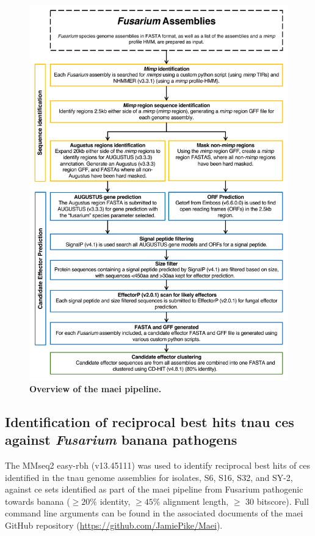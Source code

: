\begin{figure}[htp!]
    \centering
    \includegraphics[width=14cm]{Figures/Maie_v5_Figure.pdf}
    \caption[Overview of the \acf{maei} pipeline.]{\textbf{Overview of the \acf{maei} pipeline.}}  
    \label{fig:MaeiPipeline}
\end{figure}

\subsection{Identification of reciprocal best hits \acl{tnau} \aclp{ce} against \textit{Fusarium} banana pathogens}

The MMseq2 easy-rbh (v13.45111) \parencite{Steinegger2017} was used to identify reciprocal best hits of \acp{ce} identified in the \ac{tnau} genome assemblies for isolates, S6, S16, S32, and SY-2, against \ac{ce} sets identified as part of the \ac{maei} pipeline from Fusarium pathogenic towards banana ($\geq 20\%$ identity, $\geq 45\%$ alignment length, $\geq$ 30 bitscore). Full command line arguments can be found in the associated documents of the \ac{maei} GitHub repository (\href{https://github.com/JamiePike/Maei}{https://github.com/JamiePike/Maei}).   

